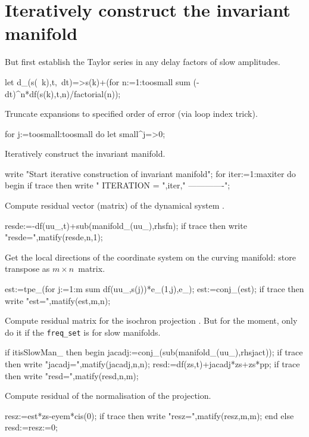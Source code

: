 \documentclass[11pt,a5paper]{article}
\begin{document}
\section{Iteratively construct the invariant manifold}

But first establish the Taylor series in any delay factors of slow amplitudes.
\begin{reduce}
let d_(s(~k),t,~dt)=>s(k)+(for n:=1:toosmall sum 
        (-dt)^n*df(s(k),t,n)/factorial(n));
\end{reduce}

Truncate expansions to specified order of error (via loop index trick).
\begin{reduce}
for j:=toosmall:toosmall do let small^j=>0;
\end{reduce}

Iteratively construct the invariant manifold.
\begin{reduce}
write "Start iterative construction of invariant manifold";
for iter:=1:maxiter do begin
if trace then write "
ITERATION = ",iter,"
-------------";
\end{reduce}

Compute residual vector (matrix) of the dynamical system \cite{Roberts96a}.
\begin{reduce}
resde:=-df(uu_,t)+sub(manifold_(uu_),rhsfn);
if trace then write "resde=",matify(resde,n,1);
\end{reduce}

Get the local directions of the coordinate system on the curving manifold: store transpose as \(m\times n\)~matrix.
\begin{reduce}
est:=tpe_(for j:=1:m sum df(uu_,s(j))*e_(1,j),e_);
est:=conj_(est);
if trace then write "est=",matify(est,m,n);
\end{reduce}

Compute residual matrix for the isochron projection \cite{Roberts89b, Roberts97b}. 
But for the moment, only do it if the \verb|freq_set| is for slow manifolds.
\begin{reduce}
if itisSlowMan_ then begin
    jacadj:=conj_(sub(manifold_(uu_),rhsjact));
    if trace then write "jacadj=",matify(jacadj,n,n);
    resd:=df(zs,t)+jacadj*zs+zs*pp;
    if trace then write "resd=",matify(resd,n,m);
\end{reduce}

Compute residual of the normalisation of the projection.
\begin{reduce}
    resz:=est*zs-eyem*cis(0);
    if trace then write "resz=",matify(resz,m,m);
end else resd:=resz:=0; %
\end{reduce}
\end{document}
